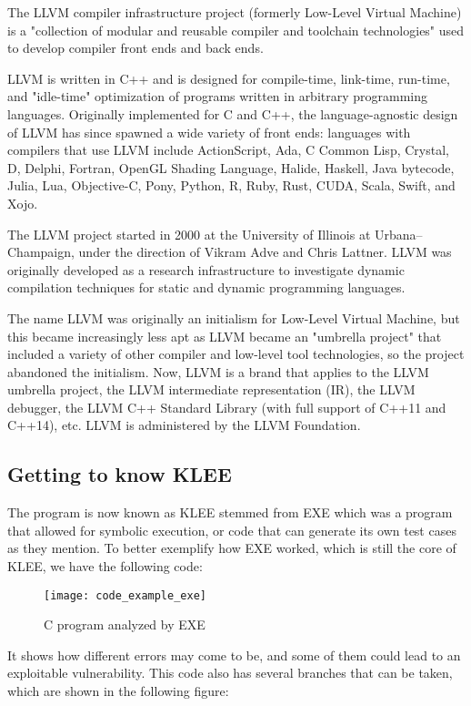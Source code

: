 The LLVM compiler infrastructure project (formerly Low-Level Virtual Machine) is a "collection of modular and reusable compiler and toolchain technologies" used to develop compiler front ends and back ends.

LLVM is written in C++ and is designed for compile-time, link-time, run-time, and "idle-time" optimization of programs written in arbitrary programming languages. Originally implemented for C and C++, the language-agnostic design of LLVM has since spawned a wide variety of front ends: languages with compilers that use LLVM include ActionScript, Ada, C Common Lisp, Crystal, D, Delphi, Fortran, OpenGL Shading Language, Halide, Haskell, Java bytecode, Julia, Lua, Objective-C, Pony, Python, R, Ruby, Rust, CUDA, Scala, Swift, and Xojo.

The LLVM project started in 2000 at the University of Illinois at Urbana–Champaign, under the direction of Vikram Adve and Chris Lattner. LLVM was originally developed as a research infrastructure to investigate dynamic compilation techniques for static and dynamic programming languages.

The name LLVM was originally an initialism for Low-Level Virtual Machine, but this became increasingly less apt as LLVM became an "umbrella project" that included a variety of other compiler and low-level tool technologies, so the project abandoned the initialism. Now, LLVM is a brand that applies to the LLVM umbrella project, the LLVM intermediate representation (IR), the LLVM debugger, the LLVM C++ Standard Library (with full support of C++11 and C++14), etc. LLVM is administered by the LLVM Foundation. \parencite{llvm}

\subsection{Getting to know KLEE}

The program is now known as KLEE\parencite{klee} stemmed from EXE \parencite{exeBook} which was a program that allowed for symbolic execution, or code that can generate its own test cases as they mention. To better exemplify how EXE worked, which is still the core of KLEE, we have the following code:

\begin{figure}[!htb]
	\caption{C program analyzed by EXE}
	\centering
	\texttt{[image: code\_example\_exe]}
\end{figure}

It shows how different errors may come to be, and some of them could lead to an exploitable vulnerability. This code also has several branches that can be taken, which are shown in the following figure:

